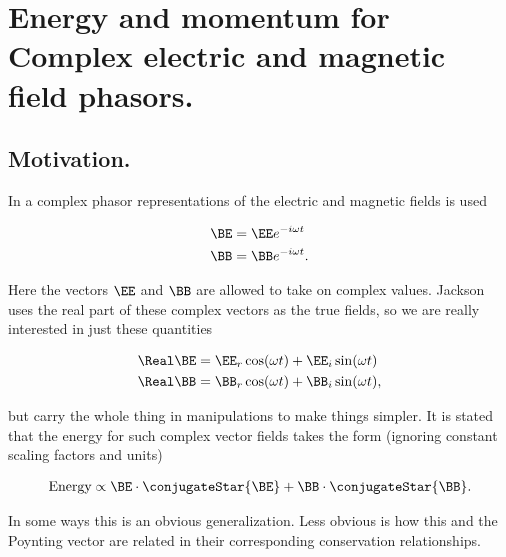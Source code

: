 

\chapter{Energy and momentum for Complex electric and magnetic field phasors.}
\label{chap:complexFieldEnergy}
{}
\date{Dec 13, 2009}

\beginArtWithToc

\section{Motivation.}

In \cite{jackson1975cew} a complex phasor representations of the electric and magnetic fields is used

\begin{subequations}
\begin{align}\label{eqn:complexFieldEnergy:1}
\BE &= \EE e^{-i\omega t} \\
\BB &= \BB e^{-i\omega t}.
\end{align}
\end{subequations}

Here the vectors $\EE$ and $\BB$ are allowed to take on complex values.  Jackson uses the real part of these complex vectors as the true fields, so we are really interested in just these quantities

\begin{subequations}
\begin{align}\label{eqn:complexFieldEnergy:2}
\Real \BE &= \EE_r \cos(\omega t) + \EE_i \sin(\omega t) \\
\Real \BB &= \BB_r \cos(\omega t) + \BB_i \sin(\omega t),
\end{align}
\end{subequations}

but carry the whole thing in manipulations to make things simpler.  It is stated that the energy for such complex vector fields takes the form (ignoring constant scaling factors and units)

\begin{align}\label{eqn:complexFieldEnergy:3}
\text{Energy} \propto \BE \cdot \conjugateStar{\BE} + \BB \cdot \conjugateStar{\BB}.
\end{align}

In some ways this is an obvious generalization.  Less obvious is how this and the Poynting vector are related in their corresponding conservation relationships.  

